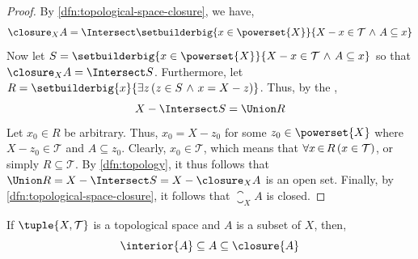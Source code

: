 \begin{proof}
    By \cref{dfn:topological-space-closure}, we have,
    \begin{equation*}
        \closure_{X}{A} = \Intersect \setbuilderbig{x \in \powerset{X}}{X - x \in \mathcal{T} \,\,{\land}\,\, A \subseteq x}
    \end{equation*}
    Now let \( S =  \setbuilderbig{x \in \powerset{X}}{X - x \in \mathcal{T} \,\,{\land}\,\, A \subseteq x} \)
    so that \( \closure_{X}{A} = \Intersect S \).
    Furthermore, let \( R = \setbuilderbig{x}{\exists z \, \mleft( z \in S \,\,{\land}\,\, x = X - z \mright)} \).
    Thus, by the ,
    \begin{equation*}
        X - \Intersect S = \Union R 
    \end{equation*}
    Let \( x_{0} \in R \) be arbitrary. Thus, \( x_{0} = X - z_{0} \) for some \( z_{0} \in \powerset{X} \) where \( X - z_{0} \in \mathcal{T} \) and \( A \subseteq z_{0}\).
    Clearly, \( x_{0} \in \mathcal{T} \), which means that \( \forall x\,{\in}\,R \, \mleft( x \in \mathcal{T} \mright) \), or simply \( R \subseteq \mathcal{T} \).
    By \cref{dfn:topology}, it thus follows that \( \Union R = X - \Intersect S = X - \closure_{X}{A} \) is an open set.
    Finally, by \cref{dfn:topological-space-closure}, it follows that \( \closure_{X}{A} \) is closed.
\end{proof}

\begin{thm}
     \label{thm:topological-space-inclusion-relations-between-interior-and-closure}
    If \( \tuple{X, \mathcal{T}} \) is a topological space and \( A \) is a subset of \( X \), then,
    \begin{equation*}
        \interior{A} \subseteq A \subseteq \closure{A}
    \end{equation*}
\end{thm}

